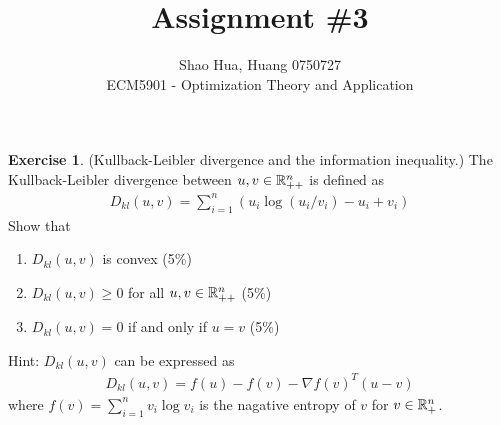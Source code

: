 \documentclass[12pt]{extarticle}
\title{Assignment \#3}
\author{Shao Hua, Huang 0750727\\
ECM5901 - Optimization Theory and Application}
\theoremstyle{definition}
\newtheorem{exercise}{Exercise}
\begin{document}
\maketitle

\begin{exercise}
  (Kullback-Leibler divergence and the information inequality.) The Kullback-Leibler divergence between $u,v\in\mathbb{R}_{++}^n$ is defined as
  \begin{align*}
    D_{kl}(u,v)=\sum_{i=1}^n(u_i\log(u_i/v_i)-u_i+v_i)
  \end{align*}
  Show that
  \begin{enumerate}[label=(\alph*)]
    \item $D_{kl}(u,v)$ is convex (5\%)
    \item $D_{kl}(u,v)\ge 0$ for all $u,v\in\mathbb{R}_{++}^n$ (5\%)
    \item $D_{kl}(u,v)=0$ if and only if $u=v$ (5\%)
  \end{enumerate}
  Hint: $D_{kl}(u,v)$ can be expressed as
  \begin{align}
    D_{kl}(u,v)=f(u)-f(v)-\nabla f(v)^T(u-v)\label{eq:1.1}
  \end{align}
  where $f(v)=\sum_{i=1}^nv_i\log v_i$ is the nagative entropy of $v$ for $v\in\mathbb{R}_{+}^n$.
\end{exercise}
\end{document}
